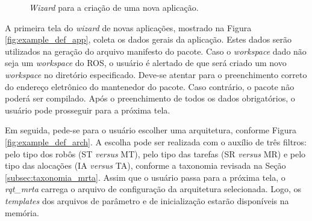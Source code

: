 \begin{figure}[htb]
            \caption{\textit{Wizard} para a criação de uma nova aplicação.} \label{fig:example_new_app}
        \end{figure}
        
        A primeira tela do \textit{wizard} de novas aplicações, mostrado na Figura \ref{fig:example_def_app}, coleta os dados gerais da aplicação. Estes dados serão utilizados na geração do arquivo manifesto do pacote. Caso o \textit{workspace} dado não seja um \textit{workspace} do ROS, o usuário é alertado de que será criado um novo \textit{workspace} no diretório especificado. Deve-se atentar para o preenchimento correto do endereço eletrônico do mantenedor do pacote. Caso contrário, o pacote não poderá ser compilado. Após o preenchimento de todos os dados obrigatórios, o usuário pode prosseguir para a próxima tela.
        
        Em seguida, pede-se para o usuário escolher uma arquitetura, conforme Figura \ref{fig:example_def_arch}. A escolha pode ser realizada com o auxílio de três filtros: pelo tipo dos robôs (ST \textit{versus} MT), pelo tipo das tarefas (SR \textit{versus} MR) e pelo tipo das alocações (IA \textit{versus} TA), conforme a taxonomia revisada na Seção \ref{subsec:taxonomia_mrta}. Assim que o usuário passa para a próxima tela, o \textit{rqt\_mrta} carrega o arquivo de configuração da arquitetura selecionada. Logo, os \textit{templates} dos arquivos de parâmetro e de inicialização estarão disponíveis na memória.
        
